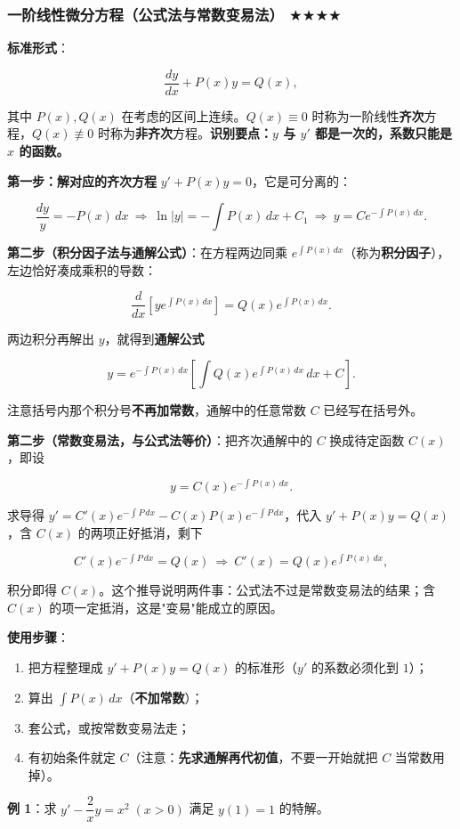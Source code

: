 \documentclass[11pt,openany,UTF8]{ctexbook}
\begin{document}
\subsubsection{一阶线性微分方程（公式法与常数变易法） $\bigstar$$\bigstar$$\bigstar$$\bigstar$}

\textbf{标准形式}：

\[\frac{dy}{dx}+P(x)y=Q(x),\]

其中 $P(x),Q(x)$ 在考虑的区间上连续。$Q(x)\equiv 0$ 时称为一阶线性\textbf{齐次}方程，$Q(x)\not\equiv 0$ 时称为\textbf{非齐次}方程。\textbf{识别要点：$y$ 与 $y'$ 都是一次的，系数只能是 $x$ 的函数。}

\textbf{第一步：解对应的齐次方程} $y'+P(x)y=0$，它是可分离的：

\[\frac{dy}{y}=-P(x)\,dx\ \Longrightarrow\ \ln\vert y\vert=-\int P(x)\,dx+C_1\ \Longrightarrow\ y=Ce^{-\int P(x)\,dx}.\]

\textbf{第二步（积分因子法与通解公式）}：在方程两边同乘 $e^{\int P(x)\,dx}$（称为\textbf{积分因子}），左边恰好凑成乘积的导数：

\[\frac{d}{dx}\left[ye^{\int P(x)\,dx}\right]=Q(x)e^{\int P(x)\,dx}.\]

两边积分再解出 $y$，就得到\textbf{通解公式}

\[y=e^{-\int P(x)\,dx}\left[\int Q(x)e^{\int P(x)\,dx}\,dx+C\right].\]

注意括号内那个积分号\textbf{不再加常数}，通解中的任意常数 $C$ 已经写在括号外。

\textbf{第二步（常数变易法，与公式法等价）}：把齐次通解中的 $C$ 换成待定函数 $C(x)$，即设

\[y=C(x)e^{-\int P(x)\,dx}.\]

求导得 $y'=C'(x)e^{-\int P\,dx}-C(x)P(x)e^{-\int P\,dx}$，代入 $y'+P(x)y=Q(x)$，含 $C(x)$ 的两项正好抵消，剩下

\[C'(x)e^{-\int P\,dx}=Q(x)\ \Longrightarrow\ C'(x)=Q(x)e^{\int P(x)\,dx},\]

积分即得 $C(x)$。这个推导说明两件事：公式法不过是常数变易法的结果；含 $C(x)$ 的项一定抵消，这是"变易"能成立的原因。

\textbf{使用步骤}：

\begin{enumerate}
\item 把方程整理成 $y'+P(x)y=Q(x)$ 的标准形（$y'$ 的系数必须化到 $1$）；
\item 算出 $\int P(x)\,dx$（\textbf{不加常数}）；
\item 套公式，或按常数变易法走；
\item 有初始条件就定 $C$（注意：\textbf{先求通解再代初值}，不要一开始就把 $C$ 当常数用掉）。
\end{enumerate}
\textbf{例 1}：求 $y'-\dfrac{2}{x}y=x^{2}\;(x>0)$ 满足 $y(1)=1$ 的特解。
\end{document}
